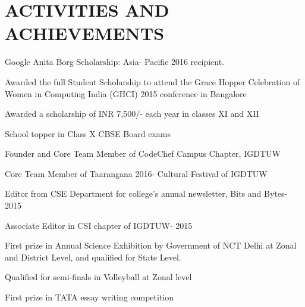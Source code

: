 \documentclass[]{resume-openfont}
\begin{document}
\begin{minipage}[t]{0.66\textwidth}
\sectionsep


\section{ACTIVITIES AND ACHIEVEMENTS}

\begin{tightemize}
\item Google Anita Borg Scholarship: Asia- Pacific 2016 recipient.
\item Awarded the full Student Scholarship to attend the Grace Hopper Celebration of Women in Computing India (GHCI) 2015 conference in Bangalore
\item Awarded a scholarship of INR 7,500/-  each year in classes XI and XII
\item School topper in Class X CBSE Board exams
\end{tightemize}
\sectionsep

\begin{tightemize}
\item Founder and Core Team Member of CodeChef Campus Chapter, IGDTUW
\item Core Team Member of Taarangana 2016- Cultural Festival of IGDTUW \\
\item Editor from CSE Department for college’s annual newsletter, Bits and Bytes- 2015
\item Associate Editor in CSI chapter of IGDTUW- 2015 \\
\end{tightemize}
\sectionsep

\begin{tightemize}
\item First prize in Annual Science Exhibition by Government of NCT Delhi at Zonal and District Level, and qualified for State Level.
\item Qualified for semi-finals in Volleyball at Zonal level
\item First prize in TATA essay writing competition
\end{tightemize}

\end{minipage} 
\end{document}
